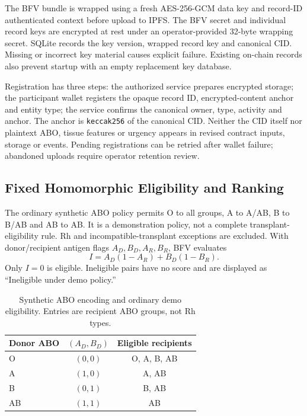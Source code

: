 \documentclass[10pt,twocolumn,a4paper]{article}
\newcommand{\code}[1]{\texttt{#1}}
\begin{document}
The BFV bundle is wrapped using a fresh AES-256-GCM data key and record-ID
authenticated context before upload to IPFS. The BFV secret and individual record
keys are encrypted at rest under an operator-provided 32-byte wrapping secret.
SQLite records the key version, wrapped record key and canonical CID. Missing or
incorrect key material causes explicit failure. Existing on-chain records also
prevent startup with an empty replacement key database.

Registration has three steps: the authorized service prepares encrypted storage;
the participant wallet registers the opaque record ID, encrypted-content anchor
and entity type; the service confirms the canonical owner, type, activity and anchor.
The anchor is \code{keccak256} of the canonical CID. Neither the CID itself nor
plaintext ABO, tissue features or urgency appears in revised contract inputs,
storage or events. Pending registrations can be retried after wallet failure;
abandoned uploads require operator retention review.

\subsection{Fixed Homomorphic Eligibility and Ranking}
The ordinary synthetic ABO policy permits O to all groups, A to A/AB, B to B/AB
and AB to AB. It is a demonstration policy, not a complete transplant-eligibility
rule. Rh and incompatible-transplant exceptions are excluded.
With donor/recipient antigen flags $A_D,B_D,A_R,B_R$, BFV evaluates
\begin{equation}
 I=A_D(1-A_R)+B_D(1-B_R).
 \label{eq:eligibility}
\end{equation}
Only $I=0$ is eligible. Ineligible pairs have no score and are displayed as
``Ineligible under demo policy.''

\begin{table}[t]
\centering\scriptsize
\caption{Synthetic ABO encoding and ordinary demo eligibility. Entries are recipient ABO groups, not Rh types.}
\label{tab:abo}
\begin{tabular}{lcc}\toprule Donor ABO & $(A_D,B_D)$ & Eligible recipients\\\midrule
O & $(0,0)$ & O, A, B, AB\\
A & $(1,0)$ & A, AB\\
B & $(0,1)$ & B, AB\\
AB & $(1,1)$ & AB\\\bottomrule
\end{tabular}
\end{table}
\end{document}
